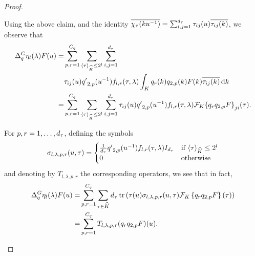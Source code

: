 \begin{proof}
\begin{description}
            Using the above claim,
            and the identity $\conj{\Character{\tau}(k u^{-1})} = \sum_{i, j = 1}^\dimRep{\tau} \tau_{ij}(u) \conj{{\tau_{ij}(k)}}$,
            we observe that
            \begin{align}
                \DifferenceOperator{q} \eta_l (\lambda) F(u)
                = &\sum_{p, r = 1}^{C_q}
                    \sum_{\JapaneseBracket{\CompactGroup}{\tau} \leq 2^l}
                        \sum_{i, j = 1}^\dimRep{\tau}\notag\\
                            &\tau_{ij}(u) {q'}_{2, p}(u^{-1})
                            f_{l, r}(\tau, \lambda)
                            \int_\CompactGroup
                                q_{r}(k) q_{2, p}(k) F(k) \conj{\tau_{ij}(k)}
                            \dd k
                            \label{eq:theorem:Littlewood-Paley_decomposition:exact_expression_for_operator}\\
                = &\sum_{p, r = 1}^{C_q}
                    \sum_{\JapaneseBracket{\CompactGroup}{\tau} \leq 2^l}
                        \sum_{i, j = 1}^\dimRep{\tau}
                            \tau_{ij}(u) {q'}_{2, p}(u^{-1})
                            f_{l, r}(\tau, \lambda)
                            \Fourier[\CompactGroup]{} {\left\{ q_{r} q_{2, p} F\right\}}_{j i}(\tau).\notag
            \end{align}

            For $p, r = 1, \dots, \dimRep{\tau}$, defining the symbols
            \begin{align}
                \sigma_{l, \lambda, p, r}(u, \tau) =
                \begin{cases}
                    \frac{1}{\dimRep{\tau}} {q'}_{2, p}(u^{-1}) f_{l, r}(\tau, \lambda) \Id{\dimRep{\tau}} & \text{if } \JapaneseBracket{\CompactGroup}{\tau} \leq 2^l\\
                    0 & \text{otherwise}
                \end{cases}
            \end{align}
            and denoting by $T_{l, \lambda, p, r}$ the corresponding operators,
            we see that in fact,
            \begin{align*}
                \DifferenceOperator{q} \eta_l (\lambda) F(u)
                = &\sum_{p, r = 1}^{C_q}
                    \sum_{\tau \in \dualGroup{\CompactGroup}}
                        \dimRep{\tau}
                        \tr \left(
                            \tau(u)
                            \sigma_{l, \lambda, p, r}(u, \tau)
                            \Fourier[\CompactGroup]{} \left\{ q_r q_{2, p} F\right\}(\tau)
                        \right)\\
                = &\sum_{p, r = 1}^{C_q}
                        T_{l, \lambda, p, r} (q_r q_{2, p} F)(u).
            \end{align*}


\end{description}
\end{proof}
